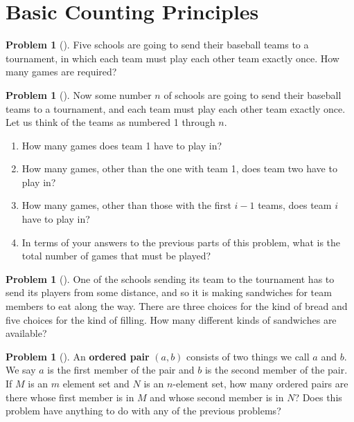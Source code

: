 \documentclass[10pt,]{book}
\newcommand{\terminology}[1]{\textbf{#1}}
\theoremstyle{plain}
\theoremstyle{definition}
\newtheorem{activity}[project]{Problem}
\theoremstyle{definition}
\numberwithin{equation}{chapter}
\begin{document}
\section[{Basic Counting Principles}]{Basic Counting Principles}\label{s1-2-basics}
\begin{activity}[] \label{fiveteamtournament}
Five schools are going to send their baseball teams to a tournament, in which each team must play each other team exactly once. How many games are required?%
\end{activity}
\begin{activity}[] \label{baseball2}
Now some number \(n\) of schools are going to send their baseball teams to a tournament, and each team must play each other team exactly once. Let us think of the teams as numbered 1 through \(n\).%
\begin{enumerate}[font=\bfseries,label=(\alph*),ref=\alph*]
\item\label{task-1} \marginsymbol[-2.5em]{} How many games does  team 1 have to play in?%
\item\label{task-2} \marginsymbol[-2.5em]{} How many games, other than the one with team 1, does team two have to play in?%
\item\label{task-3} \marginsymbol[-2.5em]{} How many games, other than those with the first \(i-1\) teams, does team \(i\) have to play in?%
\item\label{task-4} \marginsymbol[-2.5em]{} In terms of your answers to the previous parts of this problem, what is the total number of games that must be played?%
\end{enumerate}
\end{activity}
\begin{activity}[] \label{basicsandwiches}
One of the schools sending its team to the tournament has to send its players from some distance, and so it is making sandwiches for team members to eat along the way. There are three choices for the kind of bread and five choices for the kind of filling. How many different kinds of sandwiches are available?%
\end{activity}
\begin{activity}[] \label{orderedpair}
An \terminology{ordered pair} \((a,b)\) consists of two things we call \(a\) and \(b\). We say \(a\) is the first member of the pair and \(b\) is the second member of the pair. If \(M\) is an \(m\) element set and \(N\) is an \(n\)-element set, how many ordered pairs are there whose first member is in \(M\) and whose second member is in \(N\)? Does this problem have anything to do with any of the previous problems?%
\end{activity}
\end{document}
